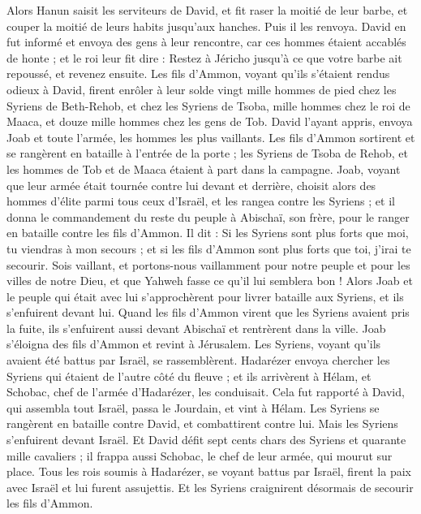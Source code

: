 \begin{multicols}{2}
Alors Hanun saisit les serviteurs de David, et fit raser la moitié de leur barbe, et couper la moitié de leurs habits jusqu'aux hanches. Puis il les renvoya.
David en fut informé et envoya des gens à leur rencontre, car ces hommes étaient accablés de honte ; et le roi leur fit dire : Restez à Jéricho jusqu'à ce que votre barbe ait repoussé, et revenez ensuite.
Les fils d’Ammon, voyant qu'ils s'étaient rendus odieux à David, firent enrôler à leur solde vingt mille hommes de pied chez les Syriens de Beth-Rehob, et chez les Syriens de Tsoba, mille hommes chez le roi de Maaca, et douze mille hommes chez les gens de Tob.
David l’ayant appris, envoya Joab et toute l'armée, les hommes les plus vaillants.
Les fils d’Ammon sortirent et se rangèrent en bataille à l'entrée de la porte ; les Syriens de Tsoba de Rehob, et les hommes de Tob et de Maaca étaient à part dans la campagne.
Joab, voyant que leur armée était tournée contre lui devant et derrière, choisit alors des hommes d'élite parmi tous ceux d'Israël, et les rangea contre les Syriens ;
et il donna le commandement du reste du peuple à Abischaï, son frère, pour le ranger en bataille contre les fils d’Ammon.
Il dit : Si les Syriens sont plus forts que moi, tu viendras à mon secours ; et si les fils d’Ammon sont plus forts que toi, j'irai te secourir.
Sois vaillant, et portons-nous vaillamment pour notre peuple et pour les villes de notre Dieu, et que Yahweh fasse ce qu'il lui semblera bon !
Alors Joab et le peuple qui était avec lui s'approchèrent pour livrer bataille aux Syriens, et ils s'enfuirent devant lui.
Quand les fils d’Ammon virent que les Syriens avaient pris la fuite, ils s'enfuirent aussi devant Abischaï et rentrèrent dans la ville. Joab s’éloigna des fils d’Ammon et revint à Jérusalem.
Les Syriens, voyant qu'ils avaient été battus par Israël, se rassemblèrent.
Hadarézer envoya chercher les Syriens qui étaient de l’autre côté du fleuve ; et ils arrivèrent à Hélam, et Schobac, chef de l'armée d’Hadarézer, les conduisait.
Cela fut rapporté à David, qui assembla tout Israël, passa le Jourdain, et vint à Hélam. Les Syriens se rangèrent en bataille contre David, et combattirent contre lui.
Mais les Syriens s'enfuirent devant Israël. Et David défit sept cents chars des Syriens et quarante mille cavaliers ; il frappa aussi Schobac, le chef de leur armée, qui mourut sur place.
Tous les rois soumis à Hadarézer, se voyant battus par Israël, firent la paix avec Israël et lui furent assujettis. Et les Syriens craignirent désormais de secourir les fils d’Ammon.

\end{multicols}
